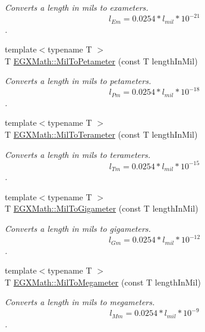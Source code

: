 \begin{DoxyCompactItemize}
\begin{DoxyCompactList}\small\item\em Converts a length in mils to exameters. \[ l_{Em}=0.0254* l_{mil} * 10^{-21} \]. \end{DoxyCompactList}\item 
{\footnotesize template$<$typename T $>$ }\\T \mbox{\hyperlink{group___e_g_x_math-_conversions-_length_conversions-_imperial-_mil-_s_i_ga43688f460a753350b8b4ac32c83bbf5e}{E\+G\+X\+Math\+::\+Mil\+To\+Petameter}} (const T length\+In\+Mil)
\begin{DoxyCompactList}\small\item\em Converts a length in mils to petameters. \[ l_{Pm}=0.0254* l_{mil} * 10^{-18} \]. \end{DoxyCompactList}\item 
{\footnotesize template$<$typename T $>$ }\\T \mbox{\hyperlink{group___e_g_x_math-_conversions-_length_conversions-_imperial-_mil-_s_i_gae1b1a9a71113ba048bcbfacdea2b6d11}{E\+G\+X\+Math\+::\+Mil\+To\+Terameter}} (const T length\+In\+Mil)
\begin{DoxyCompactList}\small\item\em Converts a length in mils to terameters. \[ l_{Tm}=0.0254* l_{mil} * 10^{-15} \]. \end{DoxyCompactList}\item 
{\footnotesize template$<$typename T $>$ }\\T \mbox{\hyperlink{group___e_g_x_math-_conversions-_length_conversions-_imperial-_mil-_s_i_ga283913ddb1b82447c2ff61ec5287a35f}{E\+G\+X\+Math\+::\+Mil\+To\+Gigameter}} (const T length\+In\+Mil)
\begin{DoxyCompactList}\small\item\em Converts a length in mils to gigameters. \[ l_{Gm}=0.0254* l_{mil} * 10^{-12} \]. \end{DoxyCompactList}\item 
{\footnotesize template$<$typename T $>$ }\\T \mbox{\hyperlink{group___e_g_x_math-_conversions-_length_conversions-_imperial-_mil-_s_i_gae228b3057d3b2341ab55f72895588b5e}{E\+G\+X\+Math\+::\+Mil\+To\+Megameter}} (const T length\+In\+Mil)
\begin{DoxyCompactList}\small\item\em Converts a length in mils to megameters. \[ l_{Mm}=0.0254* l_{mil} * 10^{-9} \]. \end{DoxyCompactList}\item 

\end{DoxyCompactItemize}
